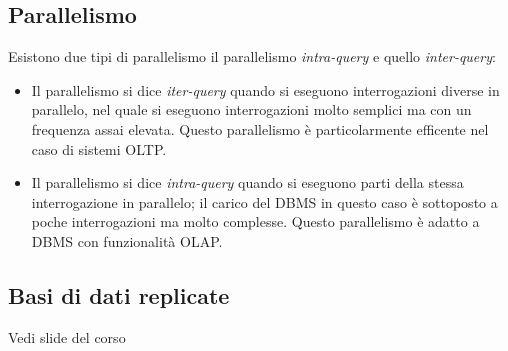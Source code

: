 \subsection{Parallelismo}
Esistono due tipi di parallelismo il parallelismo \emph{intra-query} e quello \emph{inter-query}: 
\begin{itemize}
\item Il parallelismo si dice \emph{iter-query} quando si eseguono interrogazioni diverse in parallelo, nel quale si eseguono interrogazioni molto semplici ma con un frequenza assai elevata. Questo parallelismo è particolarmente efficente nel caso di sistemi OLTP.
\item Il parallelismo si dice \emph{intra-query} quando si eseguono parti della stessa interrogazione in parallelo; il carico del DBMS in questo caso è sottoposto a poche interrogazioni ma molto complesse. Questo parallelismo è adatto a DBMS con funzionalità OLAP.
\end{itemize}
\subsection{Basi di dati replicate}
Vedi slide del corso
